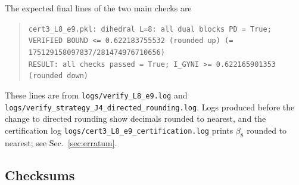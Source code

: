 \documentclass[aps,pra,onecolumn,notitlepage,superscriptaddress,longbibliography,nofootinbib,11pt]{revtex4-2}
\theoremstyle{remark}
\newcommand{\file}[1]{\texttt{#1}}
\begin{document}
The expected final lines of the two main checks are
\begin{quote}
\small
\file{cert3\_L8\_e9.pkl: dihedral L=8: all dual blocks PD = True; VERIFIED BOUND <= 0.622183755532 (rounded up) (= 175129158097837/281474976710656)}\\
\file{RESULT: all checks passed = True;  I\_GYNI >= 0.622165901353 (rounded down)}
\end{quote}
These lines are from \file{logs/verify\_L8\_e9.log} and \file{logs/verify\_strategy\_J4\_directed\_rounding.log}. Logs produced before the change to directed rounding show decimals rounded to nearest, and the certification log \file{logs/cert3\_L8\_e9\_certification.log} prints $\beta_8$ rounded to nearest; see Sec.~\ref{sec:erratum}.

\subsection{Checksums}
\end{document}
